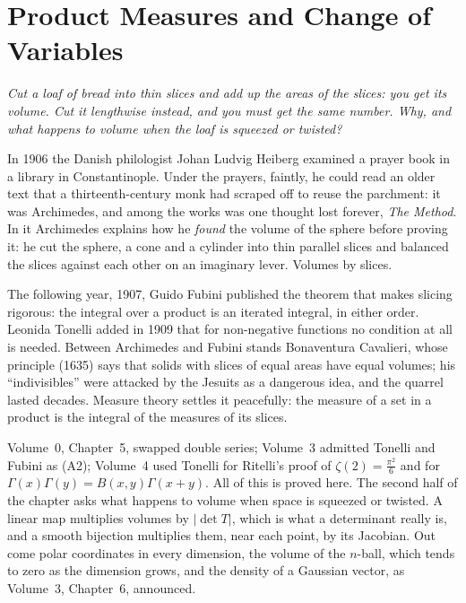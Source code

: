 \chapter{Product Measures and Change of Variables}

\begin{center}\itshape
Cut a loaf of bread into thin slices and add up the areas of the slices: you get its volume. Cut it lengthwise instead, and you
must get the same number. Why, and what happens to volume when the loaf is squeezed or twisted?
\end{center}

In 1906 the Danish philologist Johan Ludvig Heiberg examined a prayer book in a library in Constantinople. Under the
prayers, faintly, he could read an older text that a thirteenth-century monk had scraped off to reuse the parchment: it was
Archimedes, and among the works was one thought lost forever, \emph{The Method}. In it Archimedes explains how he
\emph{found} the volume of the sphere before proving it: he cut the sphere, a cone and a cylinder into thin parallel slices
and balanced the slices against each other on an imaginary lever. Volumes by slices.

The following year, 1907, Guido Fubini published the theorem that makes slicing rigorous: the integral over a product is
an iterated integral, in either order. Leonida Tonelli added in 1909 that for non-negative functions no condition at all is
needed. Between Archimedes and Fubini stands Bonaventura Cavalieri, whose principle (1635) says that solids with slices of
equal areas have equal volumes; his ``indivisibles'' were attacked by the Jesuits as a dangerous idea, and the quarrel
lasted decades. Measure theory settles it peacefully: the measure of a set in a product is the integral of the measures of
its slices.

Volume~0, Chapter~5, swapped double series; Volume~3 admitted Tonelli and Fubini as (A2); Volume~4 used Tonelli for Ritelli's
proof of $\zeta(2)=\frac{\pi^2}6$ and for $\Gamma(x)\Gamma(y)=B(x,y)\Gamma(x+y)$. All of this is proved here. The second half of
the chapter asks what happens to volume when space is squeezed or twisted. A linear map multiplies volumes by $|\det T|$,
which is what a determinant really is, and a smooth bijection multiplies them, near each point, by its Jacobian. Out come
polar coordinates in every dimension, the volume of the $n$-ball, which tends to zero as the dimension grows, and the density
of a Gaussian vector, as Volume~3, Chapter~6, announced.

